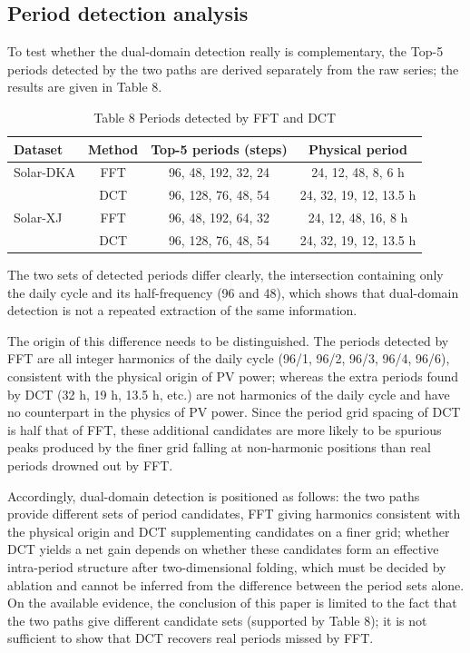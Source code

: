 \documentclass{iopjournal}
\begin{document}
\subsection{Period detection analysis}

To test whether the dual-domain detection really is complementary, the Top-5 periods detected by the two paths are derived separately from the raw series; the results are given in Table 8.

\begin{table}[htbp]
\caption{Table 8  Periods detected by FFT and DCT}
\centering
\begin{tabular}{l c c c}
\hline
Dataset & Method & Top-5 periods (steps) & Physical period \\
\hline
Solar-DKA & FFT & 96, 48, 192, 32, 24 & 24, 12, 48, 8, 6 h \\
 & DCT & 96, 128, 76, 48, 54 & 24, 32, 19, 12, 13.5 h \\
Solar-XJ & FFT & 96, 48, 192, 64, 32 & 24, 12, 48, 16, 8 h \\
 & DCT & 96, 128, 76, 48, 54 & 24, 32, 19, 12, 13.5 h \\
\hline
\end{tabular}
\label{tab8}
\end{table}

The two sets of detected periods differ clearly, the intersection containing only the daily cycle and its half-frequency (96 and 48), which shows that dual-domain detection is not a repeated extraction of the same information.

The origin of this difference needs to be distinguished. The periods detected by FFT are all integer harmonics of the daily cycle (96/1, 96/2, 96/3, 96/4, 96/6), consistent with the physical origin of PV power; whereas the extra periods found by DCT (32 h, 19 h, 13.5 h, etc.) are not harmonics of the daily cycle and have no counterpart in the physics of PV power. Since the period grid spacing of DCT is half that of FFT, these additional candidates are more likely to be spurious peaks produced by the finer grid falling at non-harmonic positions than real periods drowned out by FFT.

Accordingly, dual-domain detection is positioned as follows: the two paths provide different sets of period candidates, FFT giving harmonics consistent with the physical origin and DCT supplementing candidates on a finer grid; whether DCT yields a net gain depends on whether these candidates form an effective intra-period structure after two-dimensional folding, which must be decided by ablation and cannot be inferred from the difference between the period sets alone. On the available evidence, the conclusion of this paper is limited to the fact that the two paths give different candidate sets (supported by Table 8); it is not sufficient to show that DCT recovers real periods missed by FFT.
\end{document}
